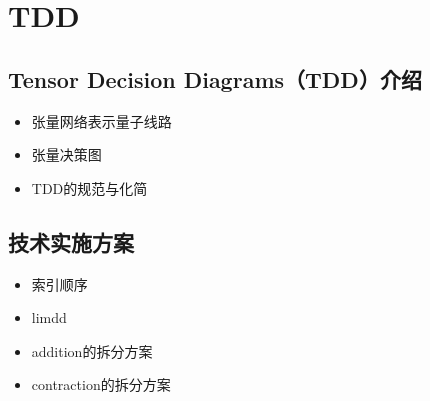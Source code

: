 \chapter{TDD}

\section{Tensor Decision Diagrams（TDD）介绍}
\begin{itemize}
  \item 张量网络表示量子线路
  \item 张量决策图
  \item TDD的规范与化简
\end{itemize}

\section{技术实施方案}
\begin{itemize}
  \item 索引顺序
  \item limdd
  \item addition的拆分方案
  \item contraction的拆分方案
\end{itemize}
